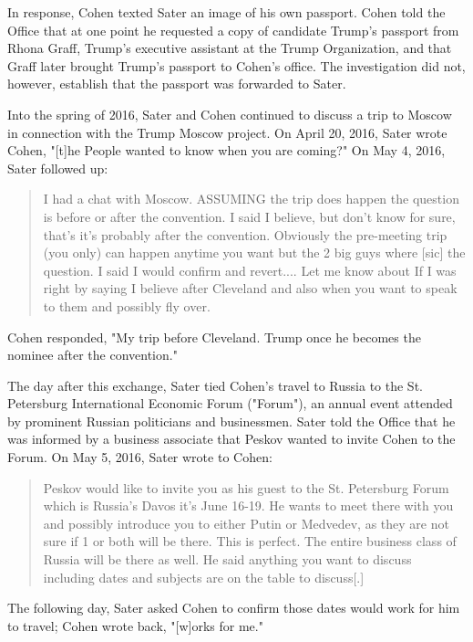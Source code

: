 In response, Cohen texted Sater an image of his own passport.%
Cohen told the Office that at one point he requested a copy of candidate Trump's passport from Rhona Graff, Trump's executive assistant at the Trump Organization, and that Graff later brought Trump's passport to Cohen's office.%
The investigation did not, however, establish that the passport was forwarded to Sater.%

Into the spring of 2016, Sater and Cohen continued to discuss a trip to Moscow in connection with the Trump Moscow project.
On April 20, 2016, Sater wrote Cohen, "[t]he People wanted to know when you are coming?"%
On May 4, 2016, Sater followed up:

\begin{quote}
I had a chat with Moscow.
ASSUMING the trip does happen the question is before or after the convention.
I said I believe, but don't know for sure, that's it's probably after the convention.
Obviously the pre-meeting trip (you only) can happen anytime you want but the 2 big guys where [sic] the question.
I said I would confirm and revert....
Let me know about If I was right by saying I believe after Cleveland and also when you want to speak to them and possibly fly over.%
\end{quote}

Cohen responded, "My trip before Cleveland.
Trump once he becomes the nominee after the convention."%

The day after this exchange, Sater tied Cohen's travel to Russia to the St. Petersburg International Economic Forum ("Forum"), an annual event attended by prominent Russian politicians and businessmen.
Sater told the Office that he was informed by a business associate that Peskov wanted to invite Cohen to the Forum.%
On May 5, 2016, Sater wrote to Cohen:

\begin{quote}
Peskov would like to invite you as his guest to the St. Petersburg Forum which is Russia's Davos it's June 16-19.
He wants to meet there with you and possibly introduce you to either Putin or Medvedev, as they are not sure if 1 or both will be there.
This is perfect.
The entire business class of Russia will be there as well.
He said anything you want to discuss including dates and subjects are on the table to discuss[.]%
\end{quote}

The following day, Sater asked Cohen to confirm those dates would work for him to travel; Cohen wrote back, "[w]orks for me."%

